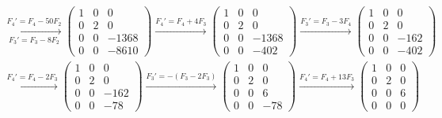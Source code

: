 \begin{ejercicio}
\begin{enumerate}
\begin{multline*}
            \xrightarrow[F_3'=F_3-8F_2]{F_4'=F_4-50F_2}
            \begin{pmatrix}
                1 & 0 & 0 \\
                0 & 2 & 0 \\
                0 & 0 & -1368 \\
                0 & 0 & -8610
            \end{pmatrix}
            \xrightarrow{F_4'=F_4+4F_3}
            \begin{pmatrix}
                1 & 0 & 0 \\
                0 & 2 & 0 \\
                0 & 0 & -1368 \\
                0 & 0 & -402
            \end{pmatrix}
            \xrightarrow{F_3'=F_3-3F_4}
            \begin{pmatrix}
                1 & 0 & 0 \\
                0 & 2 & 0 \\
                0 & 0 & -162 \\
                0 & 0 & -402
            \end{pmatrix}\\
            \xrightarrow{F_4'=F_4-2F_3}
            \begin{pmatrix}
                1 & 0 & 0 \\
                0 & 2 & 0 \\
                0 & 0 & -162 \\
                0 & 0 & -78
            \end{pmatrix}
            \xrightarrow{F_3'=-(F_3-2F_3)}
            \begin{pmatrix}
                1 & 0 & 0 \\
                0 & 2 & 0 \\
                0 & 0 & 6 \\
                0 & 0 & -78
            \end{pmatrix}
            \xrightarrow{F_4'=F_4+13F_3}
            \begin{pmatrix}
                1 & 0 & 0 \\
                0 & 2 & 0 \\
                0 & 0 & 6 \\
                0 & 0 & 0
            \end{pmatrix}
        \end{multline*}


\end{enumerate}
\end{ejercicio}
